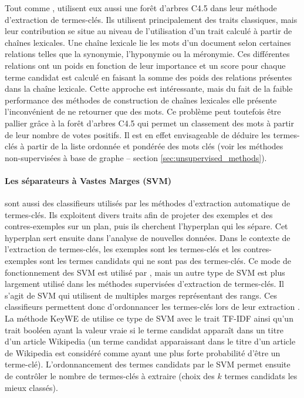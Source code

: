            Tout comme \citet{turney1999learningalgorithms},
          \citet{ercan2007lexicalchains} utilisent eux aussi une forêt d'arbres C4.5
          dans leur méthode d'extraction de termes-clés. Ils utilisent
          principalement des traits classiques, mais leur contribution se situe au
          niveau de l'utilisation d'un trait calculé à partir de chaînes lexicales.
          Une chaîne lexicale lie les mots d'un document selon certaines relations
          telles que la synonymie, l'hyponymie ou la méronymie. Ces différentes
          relations ont un poids en fonction de leur importance et un score pour
          chaque terme candidat est calculé en faisant la somme des poids des
          relations présentes dans la chaîne lexicale. Cette approche est
          intéressante, mais du fait de la faible performance des méthodes de
          construction de chaînes lexicales elle présente l'inconvénient de ne
          retourner que des mots. Ce problème peut toutefois être
          pallier grâce à la forêt d'arbres C4.5 qui permet un classement des mots à
          partir de leur nombre de votes positifs. Il est en effet envisageable de
          déduire les termes-clés à partir de la liste ordonnée et pondérée des mots
          clés (voir les méthodes non-supervisées à base de graphe -- section
          \ref{sec:unsupervised_methods}).

        \paragraph{Les séparateurs à Vastes Marges (SVM)}
          sont aussi des classifieurs utilisés par les méthodes d'extraction
          automatique de termes-clés. Ils exploitent divers traits afin de projeter
          des exemples et des contres-exemples sur un plan, puis ils cherchent
          l'hyperplan qui les sépare. Cet hyperplan sert ensuite dans l'analyse de
          nouvelles données. Dans le contexte de l'extraction de termes-clés, les
          exemples sont les termes-clés et les contres-exemples sont les termes
          candidats qui ne sont pas des termes-clés. Ce mode de fonctionnement des
          SVM est utilisé par \citet{zhang2006svm}, mais un autre type de SVM est
          plus largement utilisé dans les méthodes supervisées d'extraction de
          termes-clés. Il s'agit de SVM qui utilisent de multiples marges
          représentant des rangs. Ces classifieurs permettent donc d'ordonnancer les
          termes-clés lors de leur extraction \citep{herbrich1999svm,
          joachims2006linearsvm, jiang2009rankingsvm}. La méthode KeyWE de
          \citet{eichler2010keywe} utilise ce type de SVM avec le trait TF-IDF ainsi
          qu'un trait booléen ayant la valeur vraie si le terme candidat apparaît
          dans un titre d'un article Wikipedia (un terme candidat apparaissant dans
          le titre d'un article de Wikipedia est considéré comme ayant une plus
          forte probabilité d'être un terme-clé). L'ordonnancement des termes
          candidats par le SVM permet ensuite de contrôler le nombre de termes-clés
          à extraire (choix des $k$ termes candidats les mieux classés).

